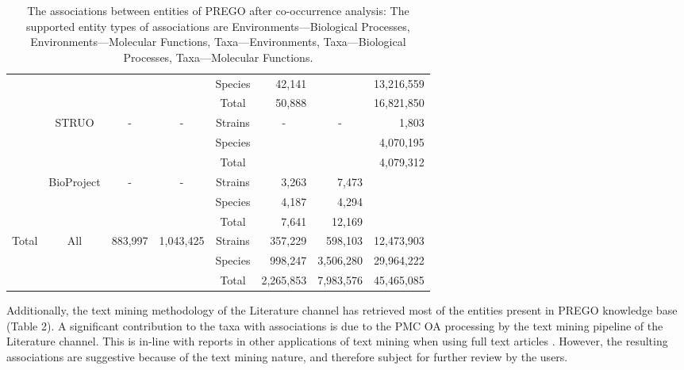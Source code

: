 {\begin{table}
\begin{tabular}{@{}cccccrcr@{}}
      &  &  &  & Species & 42,141 &  & 13,216,559 \\
      &  &  &  & Total & 50,888 &  & 16,821,850 \\
      & \multirow{3}{*}{STRUO} & \multirow{3}{*}{-} & \multirow{3}{*}{-} & Strains & \multicolumn{1}{c}{\multirow{3}{*}{-}} & \multirow{3}{*}{-} & 1,803 \\
      &  &  &  & Species & \multicolumn{1}{c}{} &  & 4,070,195 \\
      &  &  &  & Total & \multicolumn{1}{c}{} &  & 4,079,312 \\
      & \multirow{3}{*}{BioProject} & \multirow{3}{*}{-} & \multirow{3}{*}{-} & Strains & 3,263 & \multicolumn{1}{r}{7,473} & \multicolumn{1}{l}{} \\
      &  &  &  & Species & 4,187 & \multicolumn{1}{r}{4,294} & \multicolumn{1}{l}{} \\
      &  &  &  & Total & 7,641 & \multicolumn{1}{r}{12,169} & \multicolumn{1}{l}{} \\
      \multirow{3}{*}{Total} & \multirow{3}{*}{All} & \multirow{3}{*}{883,997} & \multirow{3}{*}{1,043,425} & Strains & 357,229 & \multicolumn{1}{r}{598,103} & 12,473,903 \\
      &  &  &  & Species & 998,247 & \multicolumn{1}{r}{3,506,280} & 29,964,222 \\
      &  &  &  & Total & 2,265,853 & \multicolumn{1}{r}{7,983,576} & 45,465,085 \\ \cmidrule(l){5-8} 
      \end{tabular}
      \caption[Associations among the PREGO entities]{
         The associations between entities of PREGO after co-occurrence analysis: The supported entity types of associations are Environments—Biological Processes, Environments—Molecular Functions, Taxa—Environments, Taxa—Biological Processes, Taxa—Molecular Functions.
      }
      \label{table:prego3}
   \end{table}

   Additionally, the text mining methodology of the Literature channel has retrieved most of the entities present in PREGO knowledge base (Table 2). 
   A significant contribution to the taxa with associations is due to the PMC OA processing by the text mining pipeline of the Literature channel. 
   This is in-line with reports in other applications of text mining when using full text articles \citep{westergaard2018comprehensive}. 
   However, the resulting associations are suggestive because of the text mining nature, and therefore subject for further review by the users.


}
